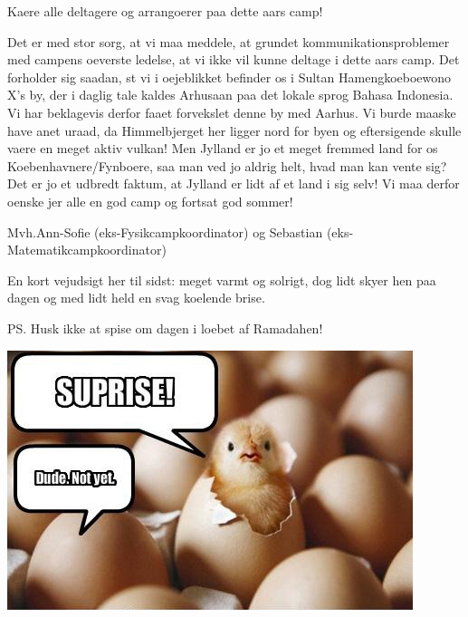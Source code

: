 \begin{minipage}[b]{0.95\linewidth}
\begin{minipage}[t]{0.47\textwidth}
Kaere alle deltagere og arrangoerer paa dette aars camp!

Det er med stor sorg, at vi maa meddele, at grundet kommunikationsproblemer med campens oeverste ledelse, at vi ikke vil kunne deltage i dette aars camp. 
Det forholder sig saadan, st vi i oejeblikket befinder os i Sultan Hamengkoeboewono X's by, der i daglig tale kaldes Arhusaan paa det lokale sprog Bahasa Indonesia. 
Vi har beklagevis derfor faaet forvekslet denne by med Aarhus. Vi burde maaske have anet uraad, da Himmelbjerget her ligger nord for byen og eftersigende skulle vaere en meget aktiv vulkan! Men Jylland er jo et meget fremmed land for os Koebenhavnere/Fynboere, saa man ved jo aldrig helt, hvad man kan vente sig? Det er jo et udbredt faktum, at Jylland er lidt af et land i sig selv!
Vi maa derfor oenske jer alle en god camp og fortsat god sommer!

Mvh.Ann-Sofie (eks-Fysikcampkoordinator) og Sebastian (eks-Matematikcampkoordinator)

En kort vejudsigt her til sidst: meget varmt og solrigt, dog lidt skyer hen paa dagen og med lidt held en svag koelende brise.

PS. Husk ikke at spise om dagen i loebet af Ramadahen!

\vspace{2mm}

\includegraphics[width=\linewidth]{suprise.jpg}

\end{minipage}
\end{minipage}
